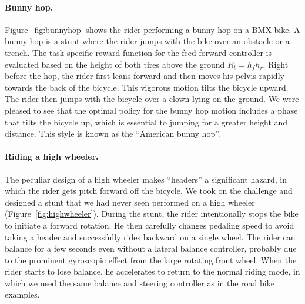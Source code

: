 \paragraph{Bunny hop.} Figure~\ref{fig:bunnyhop} shows the rider performing a bunny hop on a BMX bike. A bunny hop is a stunt where the rider jumps with the bike over an obstacle or a trench. The task-specific reward function for the feed-forward controller is evaluated based on the height of both tires above the ground $R_t=h_fh_r$. Right before the hop, the rider first leans forward and then moves his pelvis rapidly towards the back of the bicycle. This vigorous motion tilts the bicycle upward. The rider then jumps with the bicycle over a clown lying on the ground. We were pleased to see that the optimal policy for the bunny hop motion includes a phase that tilts the bicycle up, which is essential to jumping for a greater height and distance. This style is known as the ``American bunny hop''.
\vspace{-0.05in}

\paragraph{Riding a high wheeler.} The peculiar design of a high wheeler makes ``headers'' a significant hazard, in which the rider gets pitch forward off the bicycle. We took on the challenge and designed a stunt that we had never seen performed on a high wheeler (Figure~\ref{fig:highwheeler}). During the stunt, the rider intentionally stops the bike to initiate a forward rotation. He then carefully changes pedaling speed to avoid taking a header and successfully rides backward on a single wheel. The rider can balance for a few seconds even without a lateral balance controller, probably due to the prominent gyroscopic effect from the large rotating front wheel. When the rider starts to lose balance, he accelerates to return to the normal riding mode, in which we used the same balance and steering controller as in the road bike examples.
\vspace{-0.05in}

